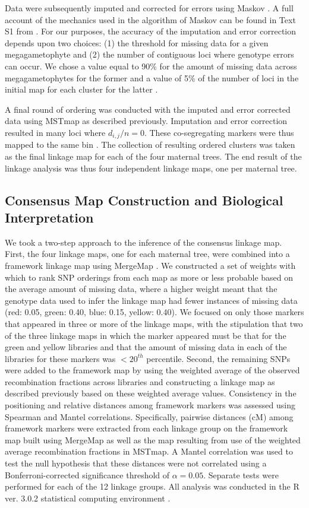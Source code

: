 \documentclass[smallextended]{svjour3}
\begin{document}
Data were subsequently imputed and corrected for errors using Maskov
\citep{Ward:2013}. A full account of the mechanics used in the algorithm of
Maskov can be found in Text S1 from \citet{Ward:2013}. For our purposes, the
accuracy of the imputation and error correction depends upon two choices: (1)
the threshold for missing data for a given megagametophyte and (2) the number of
contiguous loci where genotype errors can occur. We chose a value equal to 90\%
for the amount of missing data across megagametophytes for the former and a
value of 5\% of the number of loci in the initial map for each cluster for the
latter \citep[cf.,][]{Ward:2013}.

A final round of ordering was conducted with the imputed and error corrected
data using MSTmap as described previously. Imputation and error correction
resulted in many loci where $d_{i,j}/n = 0$. These co-segregating markers were
thus mapped to the same bin \citep{Wu:2008a}. The collection of resulting
ordered clusters was taken as the final linkage map for each of the four
maternal trees.  The end result of the linkage analysis was thus four
independent linkage maps, one per maternal tree.

\subsection*{Consensus Map Construction and Biological
  Interpretation}\label{ss:consensus}
We took a two-step approach to the inference of the consensus linkage
map. First, the four linkage maps, one for each maternal tree, were combined
into a framework linkage map using MergeMap \citep{Wu:2008b}.  We constructed a
set of weights with which to rank SNP orderings from each map as more or less
probable based on the average amount of missing data, where a higher weight
meant that the genotype data used to infer the linkage map had fewer instances
of missing data (red: 0.05, green: 0.40, blue: 0.15, yellow: 0.40). We focused on
only those markers that appeared in three or more of the linkage maps, with the
stipulation that two of the three linkage maps in which the marker appeared must
be that for the green and yellow libraries and that the amount of missing data
in each of the libraries for these markers was $< 20^{th}$ percentile. Second,
the remaining SNPs were added to the framework map by using the weighted average
of the observed recombination fractions across libraries and constructing a
linkage map as described previously based on these weighted average
values. Consistency in the positioning and relative distances among framework
markers was assessed using Spearman \citep{Spearman:1904} and Mantel
\citep{Mantel:1967} correlations. Specifically, pairwise distances (cM) among
framework markers were extracted from each linkage group on the framework map
built using MergeMap as well as the map resulting from use of the weighted
average recombination fractions in MSTmap.  A Mantel correlation was used to
test the null hypothesis that these distances were not correlated using a
Bonferroni-corrected significance threshold of $\alpha = 0.05$. Separate tests
were performed for each of the 12 linkage groups. All analysis was conducted in
the R ver. 3.0.2 statistical computing environment \citep{R:2013}.
\end{document}
